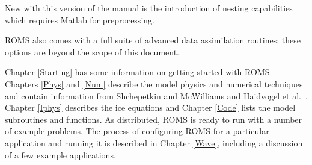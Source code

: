 New with this version of the manual is the introduction of nesting
capabilities which requires Matlab for preprocessing.

ROMS also comes with a full suite of advanced data assimilation
routines; these options are beyond the scope of this document.

Chapter \ref{Starting} has some information on getting started with
ROMS.
Chapters \ref{Phys} and \ref{Num} describe the model physics and
numerical techniques and contain information from Shchepetkin and
McWilliams \cite{SS2008b} and Haidvogel et al.\
\cite{Haidvogel07}.
Chapter \ref{Iphys} describes the ice equations and
Chapter \ref{Code} lists the model subroutines and functions.
As distributed, ROMS is ready to run with a number of example problems.
The process of configuring ROMS for a particular application and
running it is
described in Chapter \ref{Wave}, including a discussion of a few example
applications.
